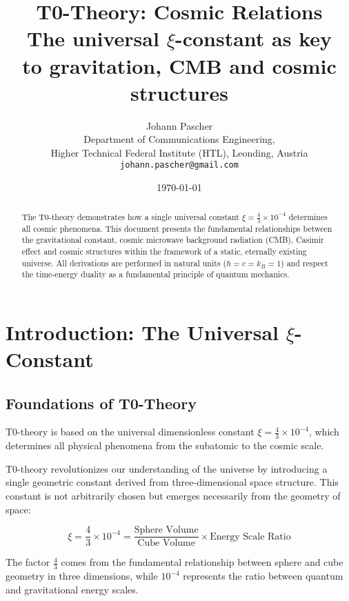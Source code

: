 \documentclass[12pt,a4paper]{article}
\title{\Huge\textbf{T0-Theory: Cosmic Relations}\\
	\Large The universal $\xi$-constant as key \\
	to gravitation, CMB and cosmic structures}
\author{\Large Johann Pascher\\
	Department of Communications Engineering,\\
	Higher Technical Federal Institute (HTL), Leonding, Austria\\
	\texttt{johann.pascher@gmail.com}}
\date{\today}
\begin{document}
	
	\maketitle
	
	\begin{abstract}
		The T0-theory demonstrates how a single universal constant $\xi = \frac{4}{3} \times 10^{-4}$ determines all cosmic phenomena. This document presents the fundamental relationships between the gravitational constant, cosmic microwave background radiation (CMB), Casimir effect and cosmic structures within the framework of a static, eternally existing universe. All derivations are performed in natural units ($\hbar = c = k_B = 1$) and respect the time-energy duality as a fundamental principle of quantum mechanics.
	\end{abstract}
	
	\tableofcontents
	\newpage
	
	\section{Introduction: The Universal $\xi$-Constant}
	
	\subsection{Foundations of T0-Theory}
	
	\begin{important}
		T0-theory is based on the universal dimensionless constant $\xi = \frac{4}{3} \times 10^{-4}$, which determines all physical phenomena from the subatomic to the cosmic scale.
	\end{important}
	
	T0-theory revolutionizes our understanding of the universe by introducing a single geometric constant derived from three-dimensional space structure. This constant is not arbitrarily chosen but emerges necessarily from the geometry of space:
	
	\begin{equation}
		\xi = \frac{4}{3} \times 10^{-4} = \frac{\text{Sphere Volume}}{\text{Cube Volume}} \times \text{Energy Scale Ratio}
	\end{equation}
	
	The factor $\frac{4}{3}$ comes from the fundamental relationship between sphere and cube geometry in three dimensions, while $10^{-4}$ represents the ratio between quantum and gravitational energy scales.
	
\end{document}
